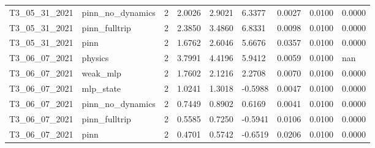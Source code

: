 \begin{table}[t]
\begin{tabular}{lllllllll}
T3\_05\_31\_2021 & pinn\_no\_dynamics & 2 & 2.0026 & 2.9021 & 6.3377 & 0.0027 & 0.0100 & 0.0000 \\
T3\_05\_31\_2021 & pinn\_fulltrip & 2 & 2.3850 & 3.4860 & 6.8331 & 0.0098 & 0.0100 & 0.0000 \\
T3\_05\_31\_2021 & pinn & 2 & 1.6762 & 2.6046 & 5.6676 & 0.0357 & 0.0100 & 0.0000 \\
T3\_06\_07\_2021 & physics & 2 & 3.7991 & 4.4196 & 5.9412 & 0.0059 & 0.0100 & nan \\
T3\_06\_07\_2021 & weak\_mlp & 2 & 1.7602 & 2.1216 & 2.2708 & 0.0070 & 0.0100 & 0.0000 \\
T3\_06\_07\_2021 & mlp\_state & 2 & 1.0241 & 1.3018 & -0.5988 & 0.0047 & 0.0100 & 0.0000 \\
T3\_06\_07\_2021 & pinn\_no\_dynamics & 2 & 0.7449 & 0.8902 & 0.6169 & 0.0041 & 0.0100 & 0.0000 \\
T3\_06\_07\_2021 & pinn\_fulltrip & 2 & 0.5585 & 0.7250 & -0.5941 & 0.0106 & 0.0100 & 0.0000 \\
T3\_06\_07\_2021 & pinn & 2 & 0.4701 & 0.5742 & -0.6519 & 0.0206 & 0.0100 & 0.0000 \\
\hline
\end{tabular}
\end{table}
